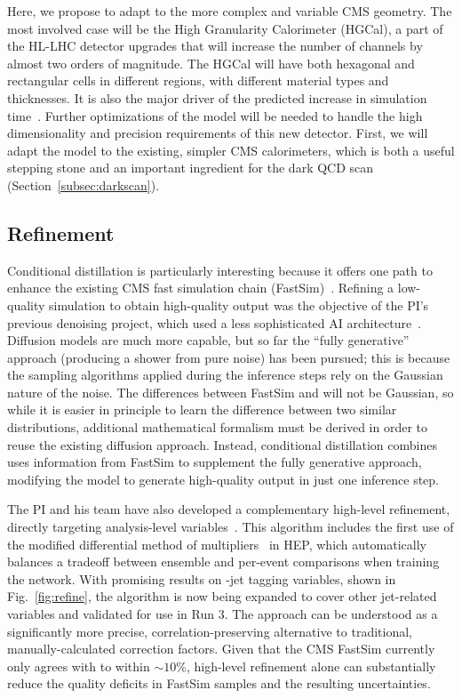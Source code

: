 Here, we propose to adapt \diffu to the more complex and variable CMS geometry.
The most involved case will be the High Granularity Calorimeter (HGCal), a part of the HL-LHC detector upgrades
that will increase the number of channels by almost two orders of magnitude.
The HGCal will have both hexagonal and rectangular cells in different regions, with different material types and thicknesses.
It is also the major driver of the predicted increase in \GEANTfour simulation time~\cite{}.
Further optimizations of the \diffu model will be needed to handle the high dimensionality and precision requirements of this new detector.
First, we will adapt the model to the existing, simpler CMS calorimeters,
which is both a useful stepping stone and an important ingredient for the dark QCD scan (Section~\ref{subsec:darkscan}).

\subsection{Refinement}\label{subsec:refine}

Conditional distillation is particularly interesting because it offers one path to enhance the existing CMS fast simulation chain (FastSim)~\cite{}.
Refining a low-quality simulation to obtain high-quality output was the objective of the PI's previous denoising project, which used a less sophisticated AI architecture~\cite{}.
Diffusion models are much more capable, but so far the ``fully generative'' approach (producing a shower from pure noise) has been pursued;
this is because the sampling algorithms applied during the inference steps rely on the Gaussian nature of the noise.
The differences between FastSim and \GEANTfour will not be Gaussian, so while it is easier in principle to learn the difference between two similar distributions,
additional mathematical formalism must be derived in order to reuse the existing diffusion approach.
Instead, conditional distillation combines uses information from FastSim to supplement the fully generative approach, modifying the model to generate high-quality output in just one inference step.

The PI and his team have also developed a complementary high-level refinement, directly targeting analysis-level variables~\cite{}.
This algorithm includes the first use of the modified differential method of multipliers~\cite{} in HEP,
which automatically balances a tradeoff between ensemble and per-event comparisons when training the network.
With promising results on \cPqb-jet tagging variables, shown in Fig.~\ref{fig:refine},
the algorithm is now being expanded to cover other jet-related variables and validated for use in Run 3.
The approach can be understood as a significantly more precise, correlation-preserving alternative to traditional, manually-calculated correction factors.
Given that the CMS FastSim currently only agrees with \GEANTfour to within ${\sim}10\%$,
high-level refinement alone can substantially reduce the quality deficits in FastSim samples and the resulting uncertainties.

